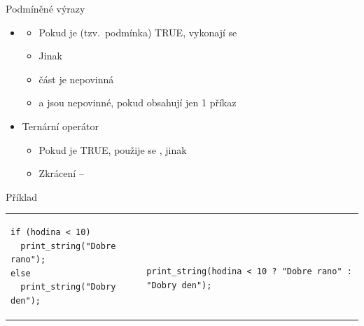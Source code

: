 \begin{frame}[fragile]{Podmíněné výrazy}

  \begin{itemize}
    \item {}
    \begin{itemize}
      \item Pokud je  (tzv.\ podmínka) TRUE, vykonají se
      \item Jinak 

      \pause

      \item {} část je nepovinná

      \pause

      \item \code{\{} a \code{\}} jsou nepovinné, pokud obsahují jen 1 příkaz
    \end{itemize}

    \pause

    \item Ternární operátor 
    \begin{itemize}
      \item Pokud je  TRUE, použije se , jinak

      \pause

      \item Zkrácení --
    \end{itemize}

  \end{itemize}


  \begin{block}{Příklad}
  \begin{center}
  \begin{tabular}{ll}
  \begin{lstlisting}
if (hodina < 10)
  print_string("Dobre rano");
else
  print_string("Dobry den");
  \end{lstlisting}
  & ~~~~
  \begin{lstlisting}
print_string(hodina < 10 ? "Dobre rano" : "Dobry den");
  \end{lstlisting}
  \end{tabular}
  \end{center}
  \end{block}

\end{frame}

